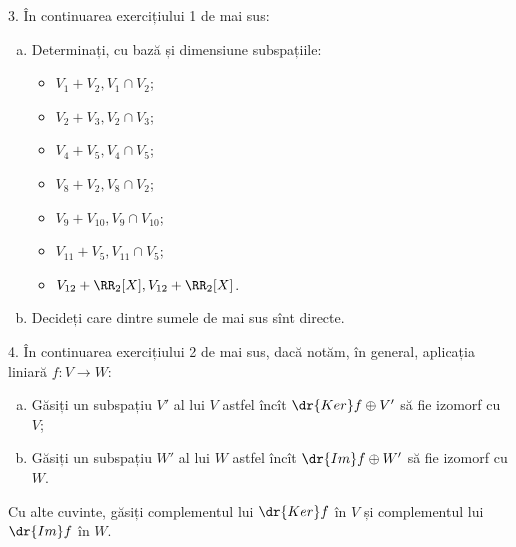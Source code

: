 3. În continuarea exercițiului 1 de mai sus:
\begin{enumerate}[(a)]
\item Determinați, cu bază și dimensiune subspațiile:
  \begin{itemize}
  \item $ V_1 + V_2, V_1 \cap V_2 $;
  \item $ V_2 + V_3, V_2 \cap V_3 $;
  \item $ V_4 + V_5, V_4 \cap V_5 $;
  \item $ V_8 + V_2, V_8 \cap V_2 $;
  \item $ V_9 + V_{10}, V_9 \cap V_{10} $;
  \item $ V_{11} + V_5, V_{11} \cap V_5 $;
  \item $ V_{12} + \RR_2[X], V_{12} + \RR_2[X] $.
  \end{itemize}
\item Decideți care dintre sumele de mai sus sînt directe.
\end{enumerate}

\vspace{1cm}

4. În continuarea exercițiului 2 de mai sus, dacă notăm, în general,
aplicația liniară $ f : V \to W $:
\begin{enumerate}[(a)]
\item Găsiți un subspațiu $ V' $ al lui $ V $ astfel încît $ \dr{Ker}f \oplus V' $
  să fie izomorf cu $ V $;
\item Găsiți un subspațiu $ W' $ al lui $ W $ astfel încît $ \dr{Im} f \oplus W' $
  să fie izomorf cu $ W $.
\end{enumerate}
Cu alte cuvinte, găsiți complementul lui $ \dr{Ker} f $ în $ V $ și complementul
lui $ \dr{Im} f $ în $ W $.



